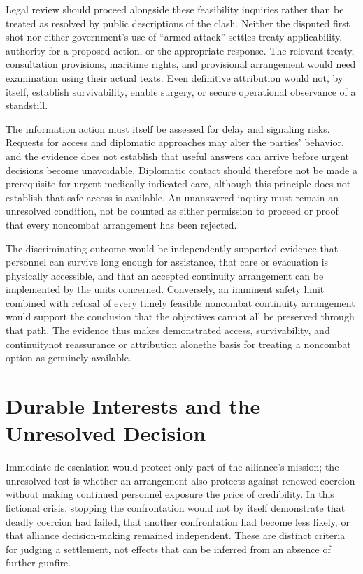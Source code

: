 \documentclass[11pt]{article}
\begin{document}
Legal review should proceed alongside these feasibility inquiries rather than be treated as resolved by public descriptions of the clash. Neither the disputed first shot nor either government\textquoteright{}s use of \textquotedblleft{}armed attack\textquotedblright{} settles treaty applicability, authority for a proposed action, or the appropriate response. The relevant treaty, consultation provisions, maritime rights, and provisional arrangement would need examination using their actual texts. Even definitive attribution would not, by itself, establish survivability, enable surgery, or secure operational observance of a standstill.

The information action must itself be assessed for delay and signaling risks. Requests for access and diplomatic approaches may alter the parties\textquoteright{} behavior, and the evidence does not establish that useful answers can arrive before urgent decisions become unavoidable. Diplomatic contact should therefore not be made a prerequisite for urgent medically indicated care, although this principle does not establish that safe access is available. An unanswered inquiry must remain an unresolved condition, not be counted as either permission to proceed or proof that every noncombat arrangement has been rejected.

The discriminating outcome would be independently supported evidence that personnel can survive long enough for assistance, that care or evacuation is physically accessible, and that an accepted continuity arrangement can be implemented by the units concerned. Conversely, an imminent safety limit combined with refusal of every timely feasible noncombat continuity arrangement would support the conclusion that the objectives cannot all be preserved through that path. The evidence thus makes demonstrated access, survivability, and continuity\textemdash{}not reassurance or attribution alone\textemdash{}the basis for treating a noncombat option as genuinely available.

\section{Durable Interests and the Unresolved Decision}
Immediate de-escalation would protect only part of the alliance\textquoteright{}s mission; the unresolved test is whether an arrangement also protects against renewed coercion without making continued personnel exposure the price of credibility. In this fictional crisis, stopping the confrontation would not by itself demonstrate that deadly coercion had failed, that another confrontation had become less likely, or that alliance decision-making remained independent. These are distinct criteria for judging a settlement, not effects that can be inferred from an absence of further gunfire.
\end{document}
